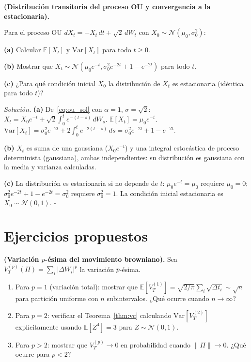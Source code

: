 \begin{ejercicio}
\label{ej:ou_distribucion}
\textbf{(Distribución transitoria del proceso OU y convergencia a la estacionaria).}

Para el proceso OU $dX_t = -X_t\,dt + \sqrt{2}\,dW_t$ con $X_0 \sim
\mathcal{N}(\mu_0,\sigma_0^2)$:

\textbf{(a)} Calcular $\mathbb{E}[X_t]$ y $\mathrm{Var}[X_t]$ para todo $t \geq 0$.

\textbf{(b)} Mostrar que $X_t \sim \mathcal{N}(\mu_0 e^{-t}, \sigma_0^2 e^{-2t}
+ 1 - e^{-2t})$ para todo $t$.

\textbf{(c)} ¿Para qué condición inicial $X_0$ la distribución de $X_t$ es
estacionaria (idéntica para todo $t$)?

\medskip\noindent\textit{Solución.}
\textbf{(a)} De~\eqref{eq:ou_sol} con $\alpha = 1$, $\sigma = \sqrt{2}$:
$X_t = X_0 e^{-t} + \sqrt{2}\int_0^t e^{-(t-s)}\,dW_s$.
$\mathbb{E}[X_t] = \mu_0 e^{-t}$.
$\mathrm{Var}[X_t] = \sigma_0^2 e^{-2t} + 2\int_0^t e^{-2(t-s)}\,ds
= \sigma_0^2 e^{-2t} + 1 - e^{-2t}$.

\textbf{(b)} $X_t$ es suma de una gaussiana ($X_0 e^{-t}$) y una integral
estocástica de proceso determinista (gaussiana), ambas independientes:
su distribución es gaussiana con la media y varianza calculadas.

\textbf{(c)} La distribución es estacionaria si no depende de $t$:
$\mu_0 e^{-t} = \mu_0$ requiere $\mu_0 = 0$; $\sigma_0^2 e^{-2t}+1-e^{-2t}
= \sigma_0^2$ requiere $\sigma_0^2 = 1$. La condición inicial estacionaria
es $X_0 \sim \mathcal{N}(0,1)$. $\square$
\end{ejercicio}

\section*{Ejercicios propuestos}

\begin{ejercicio}
\textbf{(Variación $p$-ésima del movimiento browniano).}
Sea $V_T^{(p)}(\Pi) = \sum_i |\Delta W_i|^p$ la variación $p$-ésima.
\begin{enumerate}[label=(\alph*)]
  \item Para $p = 1$ (variación total): mostrar que $\mathbb{E}[V_T^{(1)}]
        = \sqrt{2/\pi}\sum_i\sqrt{\Delta t_i} \sim \sqrt{n}$ para partición
        uniforme con $n$ subintervalos. ¿Qué ocurre cuando $n \to \infty$?
  \item Para $p = 2$: verificar el Teorema~\ref{thm:vc} calculando
        $\mathrm{Var}[V_T^{(2)}]$ explícitamente usando $\mathbb{E}[Z^4] = 3$
        para $Z \sim \mathcal{N}(0,1)$.
  \item Para $p > 2$: mostrar que $V_T^{(p)} \to 0$ en probabilidad cuando
        $\|\Pi\| \to 0$. ¿Qué ocurre para $p < 2$?
\end{enumerate}
\end{ejercicio}


